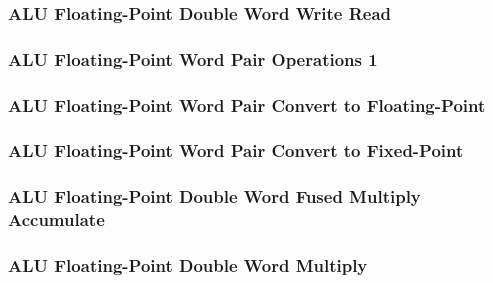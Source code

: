 \subsubsection[{\small ALU Floating-Point Double Word Write Read}]{ALU Floating-Point Double Word Write Read} \label{sec:format-ALU-DWWR}



\subsubsection[{\small ALU Floating-Point Word Pair Operations 1}]{ALU Floating-Point Word Pair Operations 1} \label{sec:format-ALU-FWPMO1}



\subsubsection[{\small ALU Floating-Point Word Pair Convert to Floating-Point}]{ALU Floating-Point Word Pair Convert to Floating-Point} \label{sec:format-ALU-FWPFLOAT}



\subsubsection[{\small ALU Floating-Point Word Pair Convert to Fixed-Point}]{ALU Floating-Point Word Pair Convert to Fixed-Point} \label{sec:format-ALU-FWPFIXED}



\subsubsection[{\small ALU Floating-Point Double Word Fused Multiply Accumulate}]{ALU Floating-Point Double Word Fused Multiply Accumulate} \label{sec:format-ALU-FDFMA}



\subsubsection[{\small ALU Floating-Point Double Word Multiply}]{ALU Floating-Point Double Word Multiply} \label{sec:format-ALU-FDMUL}

